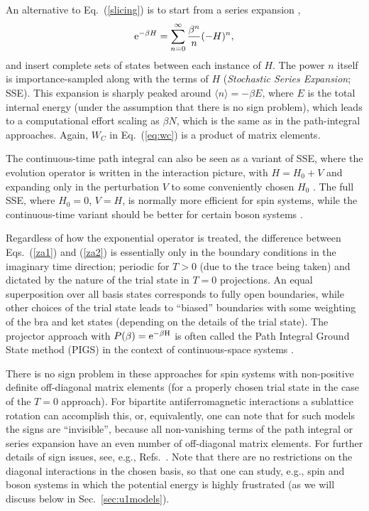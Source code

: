 \documentclass[10pt,pre,aps,twocolumn,showpacs,subscriptaddresses,floatfix]{revtex4}
\begin{document}
An alternative to Eq.~(\ref{slicing}) is to start from a series expansion \cite{Handscomb62,Sandvik91},
\begin{equation}
{\rm e}^{-\beta H}= \sum_{n=0}^\infty \frac{\beta^n}{n}(-H)^n,
\label{series}
\end{equation}
and insert complete sets of states between each instance of $H$. The power $n$ itself is importance-sampled along with the terms of $H$ 
({\it Stochastic Series Expansion}; SSE). This expansion is sharply peaked around $\langle n\rangle = -\beta E$, where $E$ is the total internal energy 
(under the assumption that there is no sign problem), which leads to a computational effort scaling as $\beta N$, which is the same as in the 
path-integral approaches. Again, $W_C$ in Eq.~(\ref{eq:wc}) is a product of matrix elements. 

The continuous-time path integral can also be seen as a variant of SSE, where the evolution operator is written in the interaction picture, 
with $H=H_0+V$ and expanding only in the perturbation $V$ to some conveniently chosen $H_0$ \cite{Prokofev96,Sandvik97a}. The full SSE, where $H_0=0$, $V=H$, 
is normally more efficient for spin systems, while the continuous-time variant should be better for certain boson systems \cite{Troyer03}.

Regardless of how the exponential operator is treated, the difference between Eqs.~(\ref{za1}) and (\ref{za2}) is essentially only in the boundary 
conditions in the imaginary time direction; periodic for $T>0$ (due to the trace being taken) and dictated by the nature of the trial state in $T=0$ 
projections. An equal superposition over all basis states corresponds to fully open boundaries, while other choices of the trial state leads to ``biased''
boundaries with some weighting of the bra and ket states (depending on the details of the trial state). The projector approach with $P(\beta)={\rm e^{-\beta H}}$
is often called the Path Integral Ground State method (PIGS) in the context of continuous-space systems \cite{Sarsa00,Vitali08}.

There is no sign problem in these approaches for spin systems with non-positive definite off-diagonal matrix elements (for a properly chosen trial state in the 
case of the $T=0$ approach). For bipartite antiferromagnetic interactions a sublattice rotation can accomplish this, or, equivalently, one can note that
for such models the signs are ``invisible'', because all non-vanishing terms of the path integral or series expansion have an even number of off-diagonal 
matrix elements. For further details of sign issues, see, e.g., Refs.~\cite{Henelius00,Evertz03,Nyfeler08}. Note that there are no restrictions on the diagonal 
interactions in the chosen basis, so that one can study, e.g., spin and boson systems in which the potential energy is highly frustrated (as we will discuss below 
in Sec.~\ref{sec:u1models}).
\end{document}

